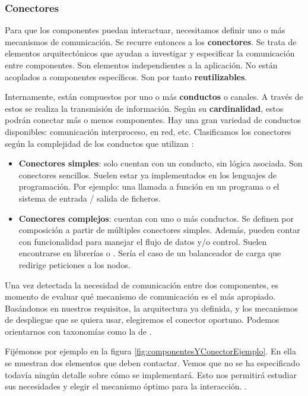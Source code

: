 \subsubsection{Conectores}

Para que los componentes puedan interactuar, necesitamos definir uno o más mecanismos de comunicación. Se recurre entonces a los \textbf{conectores}. Se trata de elementos arquitectónicos que ayudan a investigar y especificar la comunicación entre componentes. \cite{perryFoundationsStudySoftware1992} Son elementos independientes a la aplicación. No están acoplados a componentes específicos. Son por tanto \textbf{reutilizables}. \cite{taylorComponentMessagebasedArchitectural1996a}

Internamente, están compuestos por uno o más \textbf{conductos} o canales. A través de estos se realiza la transmisión de información. Según su \textbf{cardinalidad}, estos podrán conectar más o menos componentes. Hay una gran variedad de conductos disponibles: comunicación interproceso, en red, etc. Clasificamos los conectores según la complejidad de los conductos que utilizan \cite{mehtaTaxonomySoftwareConnectors2000}:

\begin{itemize}
    \item \textbf{Conectores simples}: solo cuentan con un conducto, sin lógica asociada. Son conectores sencillos. Suelen estar ya implementados en los lenguajes de programación. Por ejemplo: una llamada a función en un programa o el sistema de entrada / salida de ficheros.

    \item \textbf{Conectores complejos}: cuentan con uno o más conductos. Se definen por composición a partir de múltiples conectores simples. Además, pueden contar con funcionalidad para manejar el flujo de datos y/o control. Suelen encontrarse en librerías o . Sería el caso de un balanceador de carga que redirige peticiones a los nodos.
\end{itemize}

Una vez detectada la necesidad de comunicación entre dos componentes, es momento de evaluar qué mecanismo de comunicación es el más apropiado. Basándonos en nuestros requisitos, la arquitectura ya definida, y los mecanismos de despliegue que se quiera usar, elegiremos el conector oportuno. Podemos orientarnos con taxonomías como la de \cite{mehtaTaxonomySoftwareConnectors2000}.

Fijémonos por ejemplo en la figura \ref{fig:componentesYConectorEjemplo}. En ella se muestran dos elementos que deben contactar. Vemos que no se ha especificado todavía ningún detalle sobre cómo se implementará. Esto nos permitirá estudiar sus necesidades y elegir el mecanismo óptimo para la interacción. \cite{taylorSoftwareArchitectureFoundations2009}.

